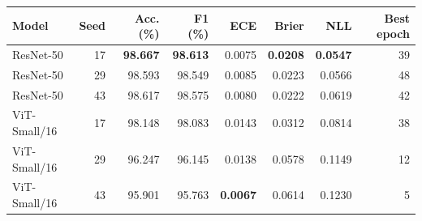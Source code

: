 \begin{tabular}{lrrrrrrr}
\toprule
Model & Seed & Acc. (\%) & F1 (\%) & ECE & Brier & NLL & Best epoch \\
\midrule
ResNet-50 & 17 & \textbf{98.667} & \textbf{98.613} & 0.0075 & \textbf{0.0208} & \textbf{0.0547} & 39 \\
ResNet-50 & 29 & 98.593 & 98.549 & 0.0085 & 0.0223 & 0.0566 & 48 \\
ResNet-50 & 43 & 98.617 & 98.575 & 0.0080 & 0.0222 & 0.0619 & 42 \\
ViT-Small/16 & 17 & 98.148 & 98.083 & 0.0143 & 0.0312 & 0.0814 & 38 \\
ViT-Small/16 & 29 & 96.247 & 96.145 & 0.0138 & 0.0578 & 0.1149 & 12 \\
ViT-Small/16 & 43 & 95.901 & 95.763 & \textbf{0.0067} & 0.0614 & 0.1230 & 5 \\
\bottomrule
\end{tabular}
